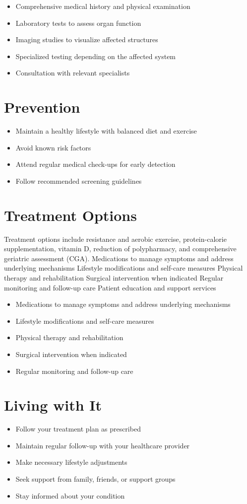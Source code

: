 \begin{itemize}[noitemsep]
  \item Comprehensive medical history and physical examination
  \item Laboratory tests to assess organ function
  \item Imaging studies to visualize affected structures
  \item Specialized testing depending on the affected system
  \item Consultation with relevant specialists
\end{itemize}
\section{Prevention}
\begin{itemize}[noitemsep]
  \item Maintain a healthy lifestyle with balanced diet and exercise
  \item Avoid known risk factors
  \item Attend regular medical check-ups for early detection
  \item Follow recommended screening guidelines
\end{itemize}
\section{Treatment Options}
Treatment options include resistance and aerobic exercise, protein-calorie supplementation, vitamin D, reduction of polypharmacy, and comprehensive geriatric assessment (CGA). Medications to manage symptoms and address underlying mechanisms Lifestyle modifications and self-care measures Physical therapy and rehabilitation Surgical intervention when indicated Regular monitoring and follow-up care Patient education and support services

\begin{itemize}[noitemsep]
  \item Medications to manage symptoms and address underlying mechanisms
  \item Lifestyle modifications and self-care measures
  \item Physical therapy and rehabilitation
  \item Surgical intervention when indicated
  \item Regular monitoring and follow-up care
\end{itemize}
\section{Living with It}
\begin{itemize}[noitemsep]
  \item Follow your treatment plan as prescribed
  \item Maintain regular follow-up with your healthcare provider
  \item Make necessary lifestyle adjustments
  \item Seek support from family, friends, or support groups
  \item Stay informed about your condition
\end{itemize}
